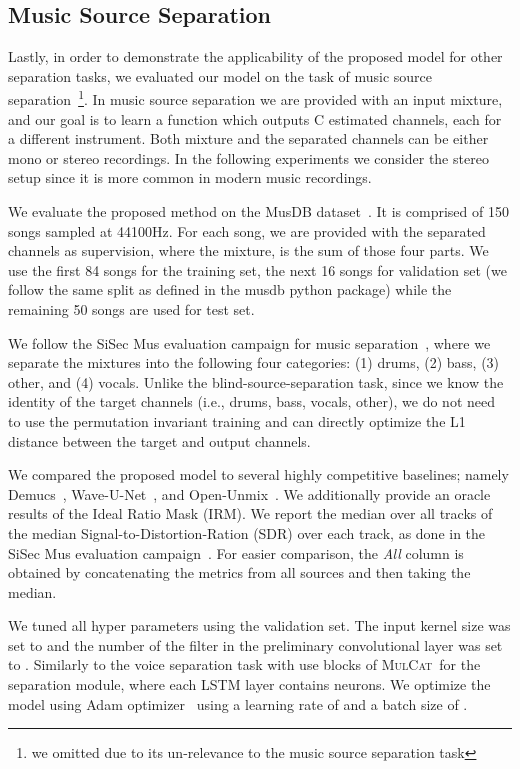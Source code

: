 \documentclass{article}
\newcommand{\ours}{\textsc{MulCat}~}
\begin{document}
\subsection{Music Source Separation}
Lastly, in order to demonstrate the applicability of the proposed model for other separation tasks, we evaluated our model on the task of music source separation~\footnote{we omitted  due to its un-relevance to the music source separation task}. In music source separation we are provided with an input mixture, and our goal is to learn a function which outputs C estimated channels, each for a different instrument. Both mixture and the separated channels can be either mono or stereo recordings. In the following experiments we consider the stereo setup since it is more common in modern music recordings.

We evaluate the proposed method on the MusDB dataset~\cite{rafii2017musdb18}. It is comprised of 150 songs sampled at 44100Hz. For each song, we are provided with the separated channels as supervision, where the mixture, is the sum of those four parts. We use the first 84 songs for the training set, the next 16 songs for validation set (we follow the same split as defined in the musdb python package) while the remaining 50 songs are used for test set.

We follow the SiSec Mus evaluation campaign for music separation~\cite{stoter20182018}, where we separate the mixtures into the following four categories: (1) drums, (2) bass, (3) other, and (4) vocals. Unlike the blind-source-separation task, since we know the identity of the target channels (i.e., drums, bass, vocals, other), we do not need to use the permutation invariant training and can directly optimize the L1 distance between the target and output channels. 

We compared the proposed model to several highly competitive baselines; namely Demucs~\cite{defossez2019music}, Wave-U-Net~\cite{stoller2018wave}, and Open-Unmix~\cite{stoter19}. We additionally provide an oracle results of the Ideal Ratio Mask (IRM). We report the median over all tracks of the median Signal-to-Distortion-Ration (SDR) over each track, as done in the SiSec Mus evaluation campaign~\cite{stoter20182018}. For easier comparison, the \textit{All} column is obtained by concatenating the metrics from all sources and then taking the median. 

 We tuned all hyper parameters using the validation set. The input kernel size  was set to  and the number of the filter in the preliminary convolutional layer was set to . Similarly to the voice separation task with use  blocks of \ours for the separation module, where each LSTM layer contains  neurons. We optimize the model using Adam optimizer~\cite{kingma2014adam} using a learning rate of  and a batch size of .
\end{document}
